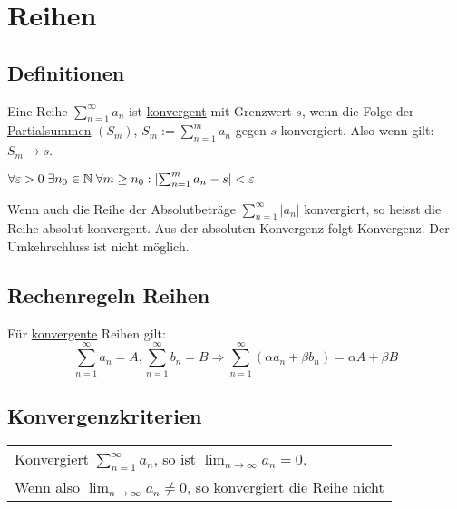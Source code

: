 \section{Reihen}

\subsection{Definitionen}
Eine Reihe $\sum_{n = 1}^\infty a_n$ ist \underline{konvergent} mit Grenzwert
$s$, wenn die Folge der \underline{Partialsummen} $(S_m)$, $S_m :=
\sum_{n=1}^m a_n$ gegen $s$ konvergiert. Also wenn gilt: $S_m \to s$.

\begin{definition}
	$\forall \varepsilon > 0 \; \exists n_0 \in \mathbb{N} \; \forall m \geq n_0: \left|
	\sum_{n=1}^m a_n - s \right| < \varepsilon$
\end{definition}

\begin{definition}
Wenn auch die Reihe der Absolutbeträge $\sum_{n=1}^\infty |a_n|$ konvergiert, so
heisst die Reihe absolut konvergent. Aus der absoluten Konvergenz folgt
Konvergenz. Der Umkehrschluss ist nicht möglich.
\end{definition}

\subsection{Rechenregeln Reihen}
Für \underline{konvergente} Reihen gilt:
\[
	\sum_{n=1}^\infty a_n = A, \sum_{n=1}^\infty b_n = B \Rightarrow
	\sum_{n=1}^\infty (\alpha a_n + \beta b_n) = \alpha A + \beta B
\]

\subsection{Konvergenzkriterien}
\begin{tabular}{|l|}
\hline
	Konvergiert $\sum_{n=1}^\infty a_n$, so ist $\lim_{n \to \infty} a_n = 0$.\\
	Wenn also $\lim_{n \to \infty} a_n \neq 0$, so konvergiert die Reihe
	\underline{nicht}\\
\hline
\end{tabular}

\onecolumn

